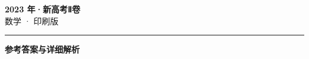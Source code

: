 \documentclass[zihao=5, a4paper]{ctexart}
\begin{document}
\begin{center}
  {\Large\bfseries 2023 年·新高考Ⅱ卷}\\[4pt]
  {\large 数学 · 印刷版}
\end{center}
\medskip
{}

\par\bigskip\hrule\bigskip
{}
\begin{center}{\large\bfseries 参考答案与详细解析}\end{center}
\smallskip

\end{document}
